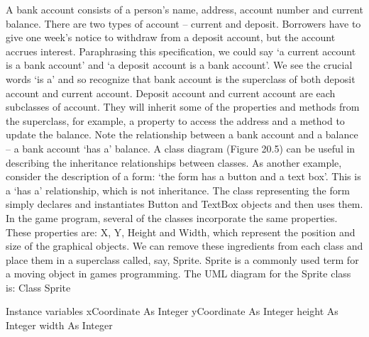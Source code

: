 A bank account consists of a person’s name, address, account number and current balance. There are two types of account – current and deposit. Borrowers have to give one week’s notice to withdraw from a deposit account, but the account accrues interest.
Paraphrasing this speciﬁcation, we could say ‘a current account is a bank account’ and ‘a deposit account is a bank account’. We see the crucial words ‘is a’ and so recognize that bank account is the superclass of both deposit account and current account. Deposit account and current account are each subclasses of account. They will inherit some of the properties and methods from the superclass, for example, a property to access the address and a method to update the balance. Note the relationship between a bank account and a balance – a bank account ‘has a’ balance.
A class diagram (Figure 20.5) can be useful in describing the inheritance relationships between classes.
As another example, consider the description of a form: ‘the form has a button and a text box’. This is a ‘has a’ relationship, which is not inheritance. The class representing the form simply declares and instantiates Button and TextBox objects and then uses them.
In the game program, several of the classes incorporate the same properties. These properties are: X, Y, Height and Width, which represent the position and size of the 
graphical objects. We can remove these ingredients from each class and place them in 
a superclass called, say, Sprite. Sprite is a commonly used term for a moving object 
in games programming. The UML diagram for the Sprite class is:
Class Sprite

Instance variables
xCoordinate As Integer
yCoordinate As Integer
height As Integer
width As Integer

